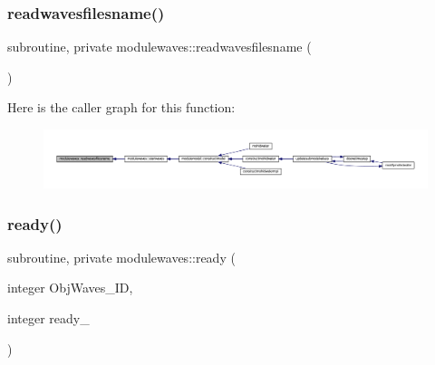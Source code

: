 \subsubsection{\texorpdfstring{readwavesfilesname()}{readwavesfilesname()}}
{\footnotesize\ttfamily subroutine, private modulewaves\+::readwavesfilesname (\begin{DoxyParamCaption}{ }\end{DoxyParamCaption})\hspace{0.3cm}{\ttfamily [private]}}

Here is the caller graph for this function\+:\nopagebreak
\begin{figure}[H]
\begin{center}
\leavevmode
\includegraphics[width=350pt]{namespacemodulewaves_abfbc4de9c60ff461e62bcb11b5e7aad8_icgraph}
\end{center}
\end{figure}
\mbox{\label{namespacemodulewaves_a15beb6e5dff252a4c77c47d43f9b6385}} 
\subsubsection{\texorpdfstring{ready()}{ready()}}
{\footnotesize\ttfamily subroutine, private modulewaves\+::ready (\begin{DoxyParamCaption}\item[{integer}]{Obj\+Waves\+\_\+\+ID,  }\item[{integer}]{ready\+\_\+ }\end{DoxyParamCaption})\hspace{0.3cm}{\ttfamily [private]}}

